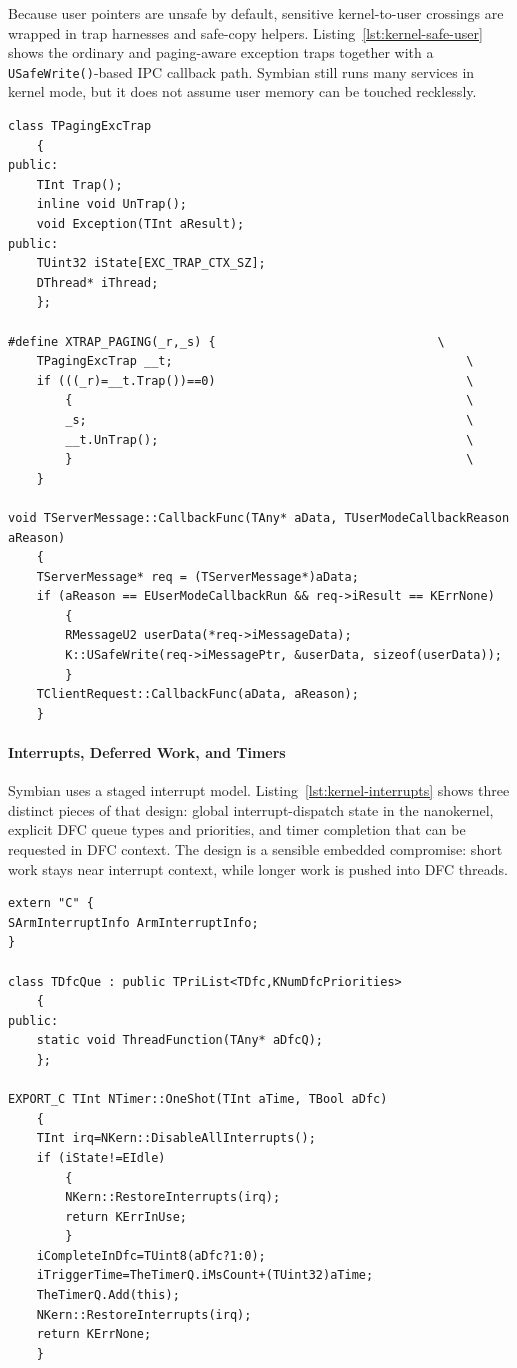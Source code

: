 Because user pointers are unsafe by default, sensitive kernel-to-user crossings
are wrapped in trap harnesses and safe-copy helpers. Listing~\ref{lst:kernel-safe-user}
shows the ordinary and paging-aware exception traps together with a
\texttt{USafeWrite()}-based IPC callback path. Symbian still runs many services
in kernel mode, but it does not assume user memory can be touched recklessly.

\begin{listing}[H]
\begin{verbatim}
class TPagingExcTrap
	{
public:
	TInt Trap();
	inline void UnTrap();
	void Exception(TInt aResult);
public:
	TUint32 iState[EXC_TRAP_CTX_SZ];
	DThread* iThread;
	};

#define XTRAP_PAGING(_r,_s)	{								\
	TPagingExcTrap __t;											\
	if (((_r)=__t.Trap())==0)									\
		{														\
		_s;														\
		__t.UnTrap();											\
		}														\
	}

void TServerMessage::CallbackFunc(TAny* aData, TUserModeCallbackReason aReason)
	{
	TServerMessage* req = (TServerMessage*)aData;
	if (aReason == EUserModeCallbackRun && req->iResult == KErrNone)
		{
		RMessageU2 userData(*req->iMessageData);
		K::USafeWrite(req->iMessagePtr, &userData, sizeof(userData));
		}
	TClientRequest::CallbackFunc(aData, aReason);
	}
\end{verbatim}
\caption{Exception trapping and safe user-memory crossing. Files:
\texttt{kern\_priv.h} and \texttt{sipc.cpp}.}
\label{lst:kernel-safe-user}
\end{listing}

\paragraph{Interrupts, Deferred Work, and Timers}

Symbian uses a staged interrupt model. Listing~\ref{lst:kernel-interrupts}
shows three distinct pieces of that design: global interrupt-dispatch state in
the nanokernel, explicit DFC queue types and priorities, and timer completion
that can be requested in DFC context. The design is a sensible embedded
compromise: short work stays near interrupt context, while longer work is
pushed into DFC threads.

\begin{listing}[H]
\begin{verbatim}
extern "C" {
SArmInterruptInfo ArmInterruptInfo;
}

class TDfcQue : public TPriList<TDfc,KNumDfcPriorities>
	{
public:
	static void ThreadFunction(TAny* aDfcQ);
	};

EXPORT_C TInt NTimer::OneShot(TInt aTime, TBool aDfc)
	{
	TInt irq=NKern::DisableAllInterrupts();
	if (iState!=EIdle)
		{
		NKern::RestoreInterrupts(irq);
		return KErrInUse;
		}
	iCompleteInDfc=TUint8(aDfc?1:0);
	iTriggerTime=TheTimerQ.iMsCount+(TUint32)aTime;
	TheTimerQ.Add(this);
	NKern::RestoreInterrupts(irq);
	return KErrNone;
	}
\end{verbatim}
\caption{Interrupt state, deferred-call queues, and timer completion policy.
Files: \texttt{arm/ncglob.cpp}, \texttt{dfcs.h}, and
\texttt{nk\_timer.cpp}.}
\label{lst:kernel-interrupts}
\end{listing}

